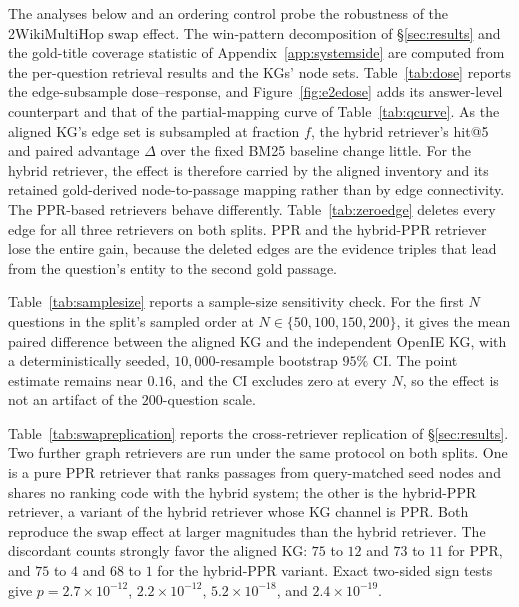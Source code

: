 \documentclass[11pt]{article}
\begin{document}
The analyses below and an ordering control probe the robustness of the 2WikiMultiHop swap effect. The win-pattern decomposition of \S\ref{sec:results} and the gold-title coverage statistic of Appendix~\ref{app:systemside} are computed from the per-question retrieval results and the KGs' node sets. Table~\ref{tab:dose} reports the edge-subsample dose--response, and Figure~\ref{fig:e2edose} adds its answer-level counterpart and that of the partial-mapping curve of Table~\ref{tab:qcurve}. As the aligned KG's edge set is subsampled at fraction $f$, the hybrid retriever's hit@5 and paired advantage $\Delta$ over the fixed BM25 baseline change little. For the hybrid retriever, the effect is therefore carried by the aligned inventory and its retained gold-derived node-to-passage mapping rather than by edge connectivity. The PPR-based retrievers behave differently. Table~\ref{tab:zeroedge} deletes every edge for all three retrievers on both splits. PPR and the hybrid-PPR retriever lose the entire gain, because the deleted edges are the evidence triples that lead from the question's entity to the second gold passage.

Table~\ref{tab:samplesize} reports a sample-size sensitivity check. For the first $N$ questions in the split's sampled order at $N\in\{50,100,150,200\}$, it gives the mean paired difference between the aligned KG and the independent OpenIE KG, with a deterministically seeded, $10{,}000$-resample bootstrap $95\%$ CI. The point estimate remains near $0.16$, and the CI excludes zero at every $N$, so the effect is not an artifact of the $200$-question scale.

Table~\ref{tab:swapreplication} reports the cross-retriever replication of \S\ref{sec:results}. Two further graph retrievers are run under the same protocol on both splits. One is a pure PPR retriever that ranks passages from query-matched seed nodes and shares no ranking code with the hybrid system; the other is the hybrid-PPR retriever, a variant of the hybrid retriever whose KG channel is PPR. Both reproduce the swap effect at larger magnitudes than the hybrid retriever. The discordant counts strongly favor the aligned KG: $75$ to $12$ and $73$ to $11$ for PPR, and $75$ to $4$ and $68$ to $1$ for the hybrid-PPR variant. Exact two-sided sign tests give $p=2.7\times10^{-12}$, $2.2\times10^{-12}$, $5.2\times10^{-18}$, and $2.4\times10^{-19}$.
\end{document}
